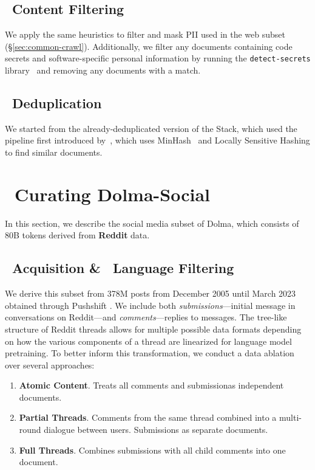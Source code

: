 \documentclass{article}
\newcommand{\dolma}{Dolma\xspace}
\newcommand{\dolmaSocial}{{\color{VarnishOscarFour}\faComments}\xspace}
\newcommand{\toolkitWget}{{\color{VarnishNovemberThree}\faDownload}\xspace}
\newcommand{\toolkitFilter}{{\color{VarnishNovemberThree}\faFilter}\xspace}
\newcommand{\toolkitDedupe}{{\color{VarnishNovemberThree}\faCopy}\xspace}
\begin{document}
\subsection{\toolkitFilter~Content Filtering} 

We apply the same heuristics to filter and mask PII used in the web subset (\S\ref{sec:common-crawl}). 
Additionally, we filter any documents containing code secrets and software-specific personal information by running the \texttt{detect-secrets} library~\citep{DetectSecrets} and removing any documents with a match.

\subsection{\toolkitDedupe~Deduplication} 

We started from the already-deduplicated version of the Stack, which used the pipeline first introduced by~\citet{Allal2023SantaCoder}, which uses MinHash~\citep{Broder2002-ra} and Locally Sensitive Hashing to find similar documents. 

\section{\dolmaSocial~Curating Dolma-Social}
\label{sec:curating-dolma-social}

\label{sec:pushshift-reddit-forum}

In this section, we describe the social media subset of \dolma,  which consists of 80B tokens derived from \textbf{Reddit} data.

\subsection{\toolkitWget~Acquisition \& \toolkitFilter~Language Filtering}

We derive this subset from 378M posts from December 2005 until March 2023 obtained through  Pushshift \citep{pushshift}.
We include both \textit{submissions}---initial message in conversations on Reddit---and \textit{comments}---replies to messages.
The tree-like structure of Reddit threads allows for multiple possible data formats depending on how the various components of a thread are linearized for language model pretraining.
To better inform this transformation, we conduct a data ablation over several approaches:

\begin{enumerate}
    \item \textbf{Atomic Content}. Treats all comments and submissionas independent documents.
    \item \textbf{Partial Threads}. Comments from the same thread combined into a multi-round dialogue between users. Submissions as separate documents. 
    \item \textbf{Full Threads}. Combines submissions with all child comments into one document.
\end{enumerate}
\end{document}
